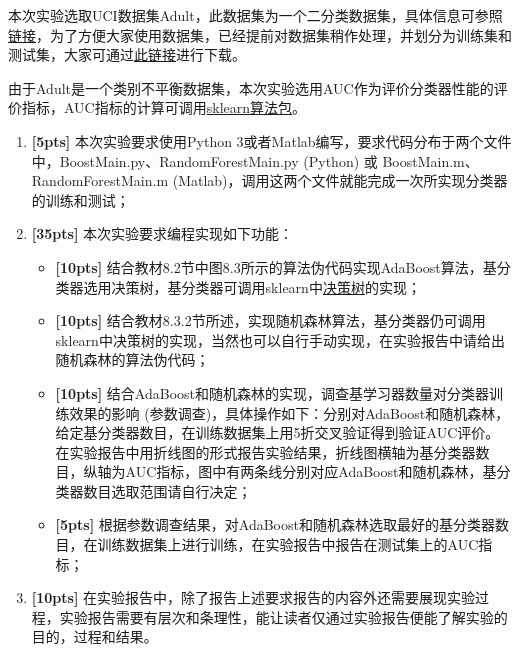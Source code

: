 \documentclass[a4paper,UTF8]{article}
\numberwithin{equation}{section}
\begin{document}
本次实验选取UCI数据集Adult，此数据集为一个二分类数据集，具体信息可参照\href{http://archive.ics.uci.edu/ml/datasets/Adult}{链接}，为了方便大家使用数据集，已经提前对数据集稍作处理，并划分为训练集和测试集，大家可通过\href{ftp://lamda.nju.edu.cn/ml2018/PS5/adult_dataset.zip}{此链接}进行下载。

由于Adult是一个类别不平衡数据集，本次实验选用AUC作为评价分类器性能的评价指标，AUC指标的计算可调用\href{http://scikit-learn.org/stable/modules/generated/sklearn.metrics.roc_auc_score.html}{sklearn算法包}。

\begin{enumerate}[(1)]
	\item \textbf{[5pts]} 本次实验要求使用Python 3或者Matlab编写，要求代码分布于两个文件中，BoostMain.py、RandomForestMain.py (Python) 或 BoostMain.m、RandomForestMain.m (Matlab)，调用这两个文件就能完成一次所实现分类器的训练和测试；
	
	\item \textbf{[35pts]} 本次实验要求编程实现如下功能：
	
	\begin{itemize}
		\item \textbf{[10pts]} 结合教材8.2节中图8.3所示的算法伪代码实现AdaBoost算法，基分类器选用决策树，基分类器可调用sklearn中\href{http://scikit-learn.org/stable/modules/generated/sklearn.tree.DecisionTreeClassifier.html}{决策树}的实现；
		\item \textbf{[10pts]} 结合教材8.3.2节所述，实现随机森林算法，基分类器仍可调用sklearn中决策树的实现，当然也可以自行手动实现，在实验报告中请给出随机森林的算法伪代码；
		\item \textbf{[10pts]} 结合AdaBoost和随机森林的实现，调查基学习器数量对分类器训练效果的影响 (参数调查)，具体操作如下：分别对AdaBoost和随机森林，给定基分类器数目，在训练数据集上用5折交叉验证得到验证AUC评价。在实验报告中用折线图的形式报告实验结果，折线图横轴为基分类器数目，纵轴为AUC指标，图中有两条线分别对应AdaBoost和随机森林，基分类器数目选取范围请自行决定；
		\item \textbf{[5pts]} 根据参数调查结果，对AdaBoost和随机森林选取最好的基分类器数目，在训练数据集上进行训练，在实验报告中报告在测试集上的AUC指标；
	\end{itemize}
	
	\item \textbf{[10pts]} 在实验报告中，除了报告上述要求报告的内容外还需要展现实验过程，实验报告需要有层次和条理性，能让读者仅通过实验报告便能了解实验的目的，过程和结果。
	
\end{enumerate}
\end{document}
